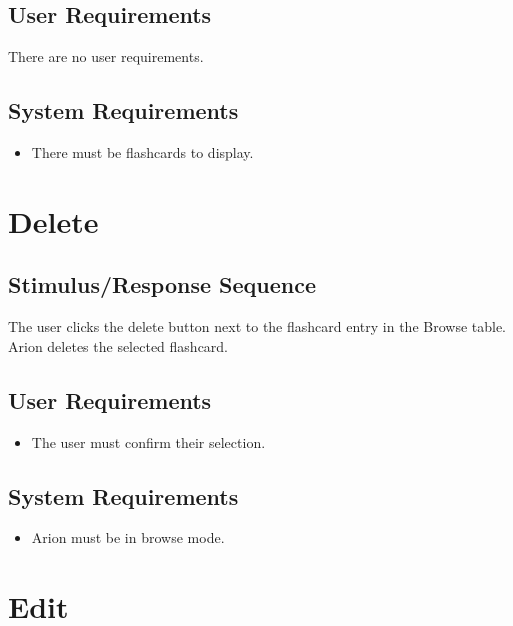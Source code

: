 \documentclass{scrreprt}
\begin{document}
    \subsection*{User Requirements}
    There are no user requirements.

    \subsection*{System Requirements}
        \begin{itemize}
            \item There must be flashcards to display.
        \end{itemize}

\section{Delete}
    \subsection*{Stimulus/Response Sequence}
        \begin{flushleft}
             The user clicks the delete button next to the flashcard entry in the Browse table. \\
             Arion deletes the selected flashcard. \\
        \end{flushleft}

    \subsection*{User Requirements}
        \begin{itemize}
            \item The user must confirm their selection.
        \end{itemize}

    \subsection*{System Requirements}
        \begin{itemize}
            \item Arion must be in browse mode.
        \end{itemize}

\section{Edit}
\end{document}
